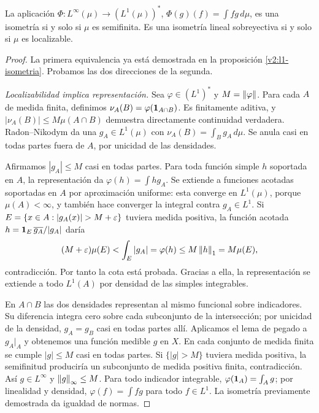 \begin{teorema}\label{v2:dual-l1-general}
La aplicación $\Phi:L^\infty(\mu)\to(L^1(\mu))^*$, $\Phi(g)(f)=\int fg\,d\mu$, es una isometría si y solo si $\mu$ es semifinita. Es una isometría lineal sobreyectiva si y solo si $\mu$ es localizable.
\end{teorema}
\begin{proof}
La primera equivalencia ya está demostrada en la proposición \ref{v2:l1-isometria}. Probamos las dos direcciones de la segunda.

\emph{Localizabilidad implica representación.} Sea $\varphi\in(L^1)^*$ y $M=\left\lVert\varphi\right\rVert$. Para cada $A$ de medida finita, definimos $\nu_A(B)=\varphi(\mathbf1_{A\cap B})$. Es finitamente aditiva, y $|\nu_A(B)|\le M\mu(A\cap B)$ demuestra directamente continuidad verdadera. Radon--Nikodym da una $g_A\in L^1(\mu)$ con $\nu_A(B)=\int_Bg_A\,d\mu$. Se anula casi en todas partes fuera de $A$, por unicidad de las densidades.

Afirmamos $|g_A|\le M$ casi en todas partes. Para toda función simple $h$ soportada en $A$, la representación da $\varphi(h)=\int hg_A$. Se extiende a funciones acotadas soportadas en $A$ por aproximación uniforme: esta converge en $L^1(\mu)$, porque $\mu(A)<\infty$, y también hace converger la integral contra $g_A\in L^1$. Si $E=\{x\in A:|g_A(x)|>M+\eps\}$ tuviera medida positiva, la función acotada $h=\mathbf1_{E}\,\overline{g_A}/|g_A|$ daría
\[
 (M+\varepsilon)\mu(E)<\int_E|g_A|=\varphi(h)\le M\left\lVert h\right\rVert_1=M\mu(E),
\]
contradicción. Por tanto la cota está probada. Gracias a ella, la representación se extiende a todo $L^1(A)$ por densidad de las simples integrables.

En $A\cap B$ las dos densidades representan al mismo funcional sobre indicadores. Su diferencia integra cero sobre cada subconjunto de la intersección; por unicidad de la densidad, $g_A=g_B$ casi en todas partes allí. Aplicamos el lema de pegado a $g_A|_A$ y obtenemos una función medible $g$ en $X$. En cada conjunto de medida finita se cumple $|g|\le M$ casi en todas partes. Si $\{|g|>M\}$ tuviera medida positiva, la semifinitud produciría un subconjunto de medida positiva finita, contradicción. Así $g\in L^\infty$ y $\left\lVert g\right\rVert_\infty\le M$. Para todo indicador integrable, $\varphi(\mathbf1_{A})=\int_Ag$; por linealidad y densidad, $\varphi(f)=\int fg$ para todo $f\in L^1$. La isometría previamente demostrada da igualdad de normas.


\end{proof}
